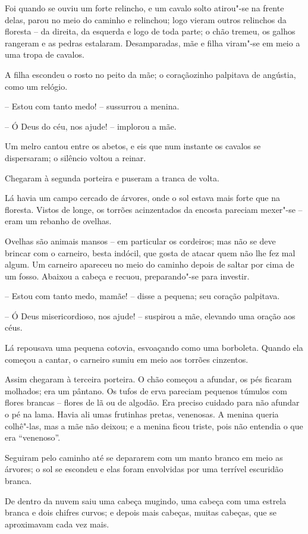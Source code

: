 Foi quando se ouviu um forte relincho, e um cavalo solto atirou"-se na
frente delas, parou no meio do caminho e relinchou; logo vieram outros
relinchos da floresta -- da direita, da esquerda e logo de toda parte; o
chão tremeu, os galhos rangeram e as pedras estalaram. Desamparadas,
mãe e filha viram"-se em meio a uma tropa de cavalos.

A filha escondeu o rosto no peito da mãe; o coraçãozinho palpitava de
angústia, como um relógio.

-- Estou com tanto medo! -- sussurrou a menina.

-- Ó Deus do céu, nos ajude! -- implorou a mãe.

Um melro cantou entre os abetos, e eis que num instante os cavalos se
dispersaram; o silêncio voltou a reinar.

Chegaram à segunda porteira e puseram a tranca de volta.

Lá havia um campo cercado de árvores, onde o sol estava mais forte que
na floresta. Vistos de longe, os torrões acinzentados da encosta
pareciam mexer"-se -- eram um rebanho de ovelhas.

Ovelhas são animais mansos -- em particular os cordeiros; mas não se deve
brincar com o carneiro, besta indócil, que gosta de atacar quem não lhe
fez mal algum. Um carneiro apareceu no meio do caminho depois de saltar
por cima de um fosso. Abaixou a cabeça e recuou, preparando"-se para
investir.

-- Estou com tanto medo, mamãe! -- disse a pequena; seu coração palpitava.

-- Ó Deus misericordioso, nos ajude! -- suspirou a mãe, elevando uma
oração aos céus.

Lá repousava uma pequena cotovia, esvoaçando como uma borboleta. Quando
ela começou a cantar, o carneiro sumiu em meio aos torrões cinzentos.

Assim chegaram à terceira porteira. O chão começou a afundar, os pés
ficaram molhados; era um pântano. Os tufos de erva pareciam pequenos
túmulos com flores brancas -- flores de lã ou de algodão. Era preciso
cuidado para não afundar o pé na lama. Havia ali umas frutinhas pretas,
venenosas. A menina queria colhê"-las, mas a mãe não deixou; e a
menina ficou triste, pois não entendia o que era ``venenoso''.

Seguiram pelo caminho até se depararem com um manto branco em meio as
árvores; o sol se escondeu e elas foram envolvidas por uma terrível
escuridão branca. 

De dentro da nuvem saiu uma cabeça mugindo, uma cabeça com uma estrela
branca e dois chifres curvos; e depois mais cabeças, muitas cabeças,
que se aproximavam cada vez mais.

